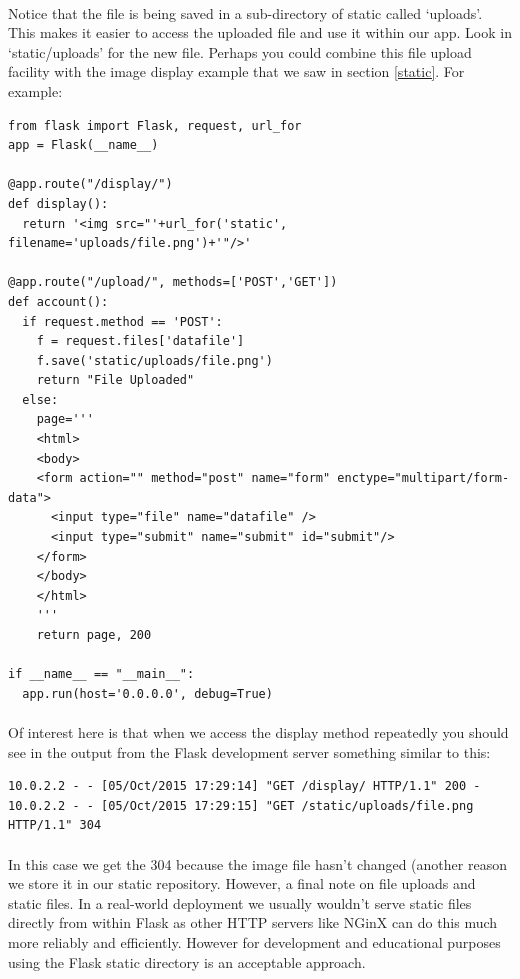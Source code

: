 \documentclass[12pt, a4paper, twoside]{book}
\begin{document}
\paragraph{} Notice that the file is being saved in a sub-directory of static called `uploads'. This makes it easier to access the uploaded file and use it within our app. Look in `static/uploads' for the new file. Perhaps you could combine this file upload facility with the image display example that we saw in section \ref{static}. For example:

\begin{lstlisting}
from flask import Flask, request, url_for
app = Flask(__name__)

@app.route("/display/")
def display():
  return '<img src="'+url_for('static', filename='uploads/file.png')+'"/>'

@app.route("/upload/", methods=['POST','GET'])
def account():
  if request.method == 'POST':
    f = request.files['datafile']
    f.save('static/uploads/file.png')
    return "File Uploaded"
  else:
    page='''
    <html>
    <body>
    <form action="" method="post" name="form" enctype="multipart/form-data">
      <input type="file" name="datafile" />
      <input type="submit" name="submit" id="submit"/>
    </form>
    </body>
    </html>
    '''
    return page, 200

if __name__ == "__main__":
  app.run(host='0.0.0.0', debug=True)
\end{lstlisting}

\paragraph{} Of interest here is that when we access the display method repeatedly you should see in the output from the Flask development server something similar to this:

\begin{lstlisting}[style=DOS]
10.0.2.2 - - [05/Oct/2015 17:29:14] "GET /display/ HTTP/1.1" 200 -
10.0.2.2 - - [05/Oct/2015 17:29:15] "GET /static/uploads/file.png HTTP/1.1" 304
\end{lstlisting}

\paragraph{} In this case we get the 304 because the image file hasn't changed (another reason we store it in our static repository. However, a final note on file uploads and static files. In a real-world deployment we usually wouldn't serve static files directly from within Flask as other HTTP servers like NGinX can do this much more reliably and efficiently. However for development and educational purposes using the Flask static directory is an acceptable approach.
\end{document}
